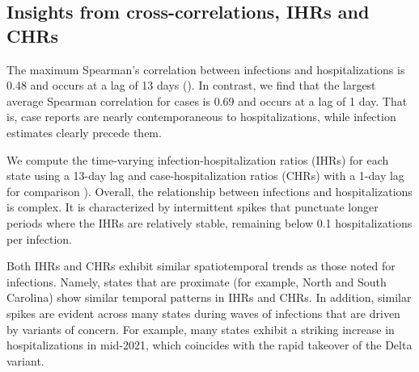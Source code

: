 \subsection{Insights from cross-correlations, IHRs and CHRs}
\label{sec:lagged-correlations}

The maximum Spearman's correlation between infections and hospitalizations
is 0.48 and occurs at a lag of 13 days (). 
In contrast, we find that the
largest average Spearman correlation for cases is 0.69 and occurs at a lag of 1
day. That is, case reports are nearly contemporaneous to hospitalizations, while
infection estimates clearly precede them. 

We compute the time-varying infection-hospitalization ratios (IHRs) for each
state using a 13-day lag and case-hospitalization ratios (CHRs) with a 1-day lag
for comparison ). Overall, the relationship between
infections and hospitalizations is complex. It is characterized by intermittent
spikes that punctuate longer periods where the IHRs are relatively stable,
remaining below 0.1 hospitalizations per infection. 

Both IHRs and CHRs exhibit similar spatiotemporal trends as those noted
for infections. Namely, states that are proximate (for example, North and South
Carolina) show similar temporal patterns in IHRs and CHRs. In addition, similar
spikes are evident across many states during waves of infections that are driven
by variants of concern. For example, many states exhibit a striking increase in
hospitalizations in mid-2021, which coincides with the rapid takeover of the
Delta variant. \citep{hodcroft2021covariants}





